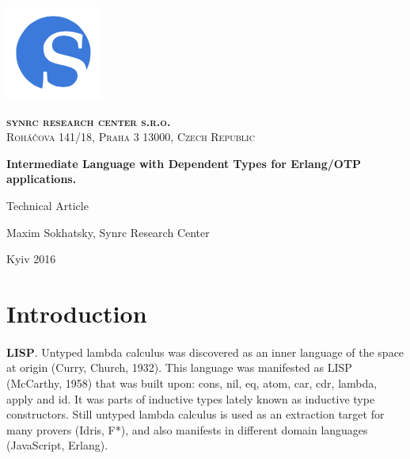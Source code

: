 \documentclass[11pt,oneside]{article}
\begin{document}
\thispagestyle{empty}
\begin{center}

\begin{minipage}[t]{2cm}
    \includegraphics[scale=0.4]{img/S}
\end{minipage}
\begin{minipage}[t]{12cm}
    \begin{flushright}
        \textsc{{\Large {\bf {\color{Blue}syn}{\color{OrangeRed}rc} research center s.r.o.}}}\\
        \textsc{Roháčova 141/18, Praha 3 13000, Czech Republic}\\
    \end{flushright}
\end{minipage}

\vspace{3cm}

    \vspace{3cm}   {\Large \bf Intermediate Language with Dependent Types for Erlang/OTP applications.\\}\par
    \vspace{0.3cm} {\Large Technical Article\par}
    \vspace{0.3cm} {\Large Maxim Sokhatsky, Synrc Research Center\par}
    \vspace{4cm}   {\Large Kyiv 2016}

\end{center}

\newpage
\vspace{2cm}
\tableofcontents
\newpage
\section{Introduction}

\vspace{1cm}


\paragraph{}
{\bf LISP}. Untyped lambda calculus was discovered as an inner language of the space
at origin (Curry, Church, 1932). This language was manifested as LISP (McCarthy, 1958)
that was built upon: cons, nil, eq, atom, car, cdr, lambda, apply and id.
It was parts of inductive types lately known as inductive type constructors.
Still untyped lambda calculus is used as an extraction target for many
provers (Idris, F*), and also manifests in different domain languages (JavaScript, Erlang).
\end{document}
